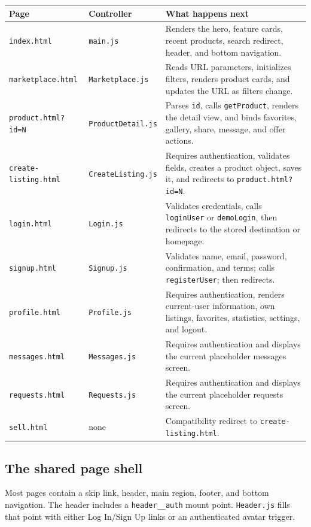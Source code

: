 \documentclass[10pt]{article}
\newcommand{\code}[1]{\texttt{#1}}
\begin{document}
\begin{tabular}{@{}p{3.0cm}p{3.7cm}p{6.6cm}@{}}
\toprule
\textbf{Page} & \textbf{Controller} & \textbf{What happens next} \\
\midrule
\code{index.html} & \code{main.js} & Renders the hero, feature cards, recent products, search redirect, header, and bottom navigation. \\
\code{marketplace.html} & \code{Marketplace.js} & Reads URL parameters, initializes filters, renders product cards, and updates the URL as filters change. \\
\code{product.html?id=N} & \code{ProductDetail.js} & Parses \code{id}, calls \code{getProduct}, renders the detail view, and binds favorites, gallery, share, message, and offer actions. \\
\code{create-listing.html} & \code{CreateListing.js} & Requires authentication, validates fields, creates a product object, saves it, and redirects to \code{product.html?id=N}. \\
\code{login.html} & \code{Login.js} & Validates credentials, calls \code{loginUser} or \code{demoLogin}, then redirects to the stored destination or homepage. \\
\code{signup.html} & \code{Signup.js} & Validates name, email, password, confirmation, and terms; calls \code{registerUser}; then redirects. \\
\code{profile.html} & \code{Profile.js} & Requires authentication, renders current-user information, own listings, favorites, statistics, settings, and logout. \\
\code{messages.html} & \code{Messages.js} & Requires authentication and displays the current placeholder messages screen. \\
\code{requests.html} & \code{Requests.js} & Requires authentication and displays the current placeholder requests screen. \\
\code{sell.html} & none & Compatibility redirect to \code{create-listing.html}. \\
\bottomrule
\end{tabular}

\subsection{The shared page shell}

Most pages contain a skip link, header, main region, footer, and bottom navigation. The header includes a \code{header\_\_auth} mount point. \code{Header.js} fills that point with either Log In/Sign Up links or an authenticated avatar trigger.
\end{document}
